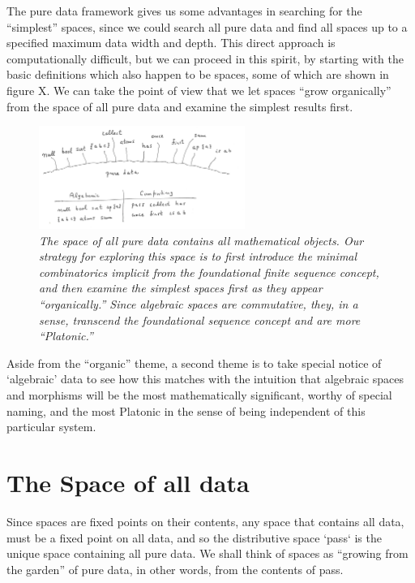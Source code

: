 \documentclass[11pt]{article}
\begin{document}
    The pure data framework gives us some advantages in searching for the ``simplest'' spaces, since we could search all pure data and find all spaces 
up to a specified maximum data width and depth.  This direct approach is computationally difficult, but we can proceed in this spirit, by starting with 
the basic definitions which also happen to be spaces, some of which are shown in figure X.   We can take the point of view that we let 
spaces ``grow organically'' from the space of all pure data and examine the simplest results first.  
\begin{figure}[h]
\centering
\includegraphics[width=0.6\textwidth]{garden.png}
\caption{{\it The space of all pure data contains all mathematical objects.  Our strategy for exploring this space is to first introduce 
the minimal combinatorics implicit from the foundational finite sequence concept, and then examine the simplest spaces first as they 
appear ``organically.''  Since algebraic spaces are commutative, they, in a sense, transcend the foundational sequence concept and are more ``Platonic.''}}
\end{figure}
Aside from the ``organic'' theme, a second theme is to take special notice of `algebraic' data to see how this matches with the intuition that 
algebraic spaces and morphisms will be the most mathematically significant, worthy of special naming, and the most Platonic in the sense
of being independent of this particular system.  

\section{The Space of all data} 

     Since spaces are fixed points on their contents, any space that contains all data, must be a fixed point on all data, and so the distributive space `pass` is 
the unique space containing all pure data.  We shall think of spaces as ``growing from the garden'' of pure data, in other words, from the 
contents of pass. 
\end{document}
